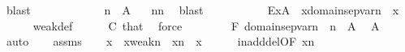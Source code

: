\begin{isabellebody}
\ blast\ \ \ \ \isanewline
\ \ \ \ \isamarkupfalse%
\ {}\ \isamarkupfalse%
\ {\isachardoublequoteopen}{}{\isacharhash}{\kern0pt}{\isacharplus}{\kern0pt}n\ {\isasymnotin}\ {\isacharquery}{\kern0pt}A{\isachardoublequoteclose}\ \isamarkupfalse%
\ \ {\isacartoucheopen}{\isasymnot}{}{\isacharhash}{\kern0pt}{\isacharplus}{\kern0pt}n{\isacharless}{\kern0pt}{}{\isacharhash}{\kern0pt}{\isacharplus}{\kern0pt}n{\isacartoucheclose}\ \isamarkupfalse%
\ blast\isanewline
\ \ \isamarkupfalse%
\isanewline
\ \ \isamarkupfalse%
\ \isanewline
\ \ \isamarkupfalse%
\ E{\isacharcolon}{\kern0pt}{\isachardoublequoteopen}x{\isasymnotin}{\isacharquery}{\kern0pt}A{\isachardoublequoteclose}\ \ {\isachardoublequoteopen}x{\isasymin}domain{\isacharparenleft}{\kern0pt}sep{\isacharunderscore}{\kern0pt}var{\isacharparenleft}{\kern0pt}n{\isacharparenright}{\kern0pt}{\isacharparenright}{\kern0pt}{\isachardoublequoteclose}\ \ x\ \isanewline
\ \ \ \ \isamarkupfalse%
\ weak{\isacharunderscore}{\kern0pt}def\isanewline
\ \ \ \ \isamarkupfalse%
\ C\ that\ \isamarkupfalse%
\ force\isanewline
\ \ \isamarkupfalse%
\ \isanewline
\ \ \isamarkupfalse%
\ F{\isacharcolon}{\kern0pt}\ {\isachardoublequoteopen}domain{\isacharparenleft}{\kern0pt}sep{\isacharunderscore}{\kern0pt}var{\isacharparenleft}{\kern0pt}n{\isacharparenright}{\kern0pt}{\isacharparenright}{\kern0pt}\ {\isasymsubseteq}\ {}{\isacharhash}{\kern0pt}{\isacharplus}{\kern0pt}n\ {\isacharminus}{\kern0pt}\ {\isacharquery}{\kern0pt}A{\isachardoublequoteclose}\ \isamarkupfalse%
\ A\ \isamarkupfalse%
\ auto\isanewline
\ \ \isamarkupfalse%
\ assms\isanewline
\ \ \isamarkupfalse%
\ {\isachardoublequoteopen}x{\isacharless}{\kern0pt}{}\ {\isasymor}\ x{\isasymin}weak{\isacharparenleft}{\kern0pt}n{\isacharcomma}{\kern0pt}{}{\isacharparenright}{\kern0pt}{\isachardoublequoteclose}\ \ {\isachardoublequoteopen}x{\isasymin}{}{\isacharhash}{\kern0pt}{\isacharplus}{\kern0pt}n{\isachardoublequoteclose}\ \ x\isanewline
\ \ \ \ \isamarkupfalse%
\ in{\isacharunderscore}{\kern0pt}add{\isacharunderscore}{\kern0pt}del{\isacharbrackleft}{\kern0pt}OF\ {\isacartoucheopen}x{\isasymin}{}{\isacharhash}{\kern0pt}{\isacharplus}{\kern0pt}n{\isacartoucheclose}{\isacharbrackright}{\kern0pt}\ \isamarkupfalse%

\end{isabellebody}
